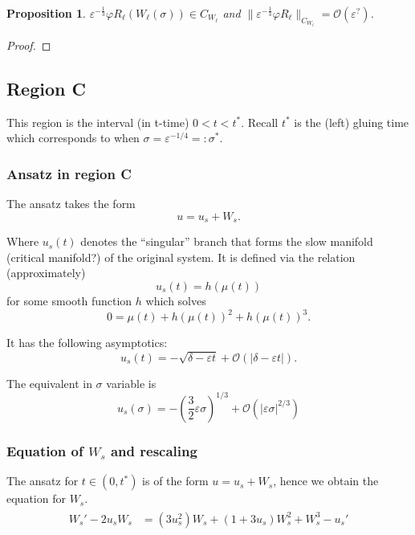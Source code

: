 \documentclass[letterpaper,11pt]{article}
\newcommand{\rmO}{\mathcal{O}}
\newcommand{\eps}{\varepsilon}
\numberwithin{equation}{section}
\theoremstyle{plain}
\newtheorem{proposition}[theorem]{Proposition}
\begin{document}
\begin{proposition}
$ \eps^{-\frac{1}{3}}\varphi R_\ell(W_\ell(\sigma))  \in C_{W_\ell}$ and $\| \eps^{-\frac{1}{3}}\varphi R_\ell \|_{C_{W_\ell}} = \rmO(\eps^{?})$.
\end{proposition}

\begin{proof}

\end{proof}




\subsection{Region C}
This region is the interval (in t-time) $0<t<t^*$. Recall $t^*$ is the (left) gluing time which corresponds to when $\sigma = \eps^{-1/4}=:\sigma^*$.

\subsubsection{Ansatz in region C}
The ansatz takes the form 
\[
u = u_s  +W_s.
\]

Where  $u_s(t)$ denotes the ``singular'' branch that forms the slow manifold (critical manifold?) of the original system. It is defined via the relation (approximately)
\[
u_s(t) = h(\mu(t))
\]
for some smooth function $h$ which solves
\begin{equation}\label{singular}
0 = \mu(t) + h(\mu(t))^2 + h(\mu(t))^3.
\end{equation}

It has the following asymptotics:
\begin{equation}\label{singularAsy}
u_s(t) = -\sqrt{\delta-\eps t} + \rmO(|\delta-\eps t|).
\end{equation}

The equivalent in $\sigma$ variable is
\begin{equation}\label{singularAsySig}
u_s(\sigma) = -\left(\frac{3}{2}\eps \sigma\right)^{1/3} + \rmO(|\eps \sigma|^{2/3} )
\end{equation}



\subsubsection{Equation of \texorpdfstring{$W_{s}$}{Ws} and rescaling }
The ansatz for $t \in (0, t^*)$ is of the form $u= u_s + W_s$, hence we obtain the equation for $W_s$.
\begin{align}\label{Eqn_ws}
\begin{split}
W_{s}' -2u_sW_s &=   (3u_s^2)W_s + (1+3u_s)W_s^2 + W_s^3 - u_s'
\end{split}
\end{align}
\end{document}
